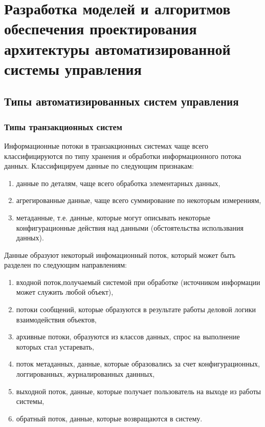 \chapter{Разработка моделей и алгоритмов обеспечения проектирования архитектуры автоматизированной системы управления}\label{ch:ch2}
\section{Типы автоматизированных систем управления}\label{sec:ch2/sec1}
\subsection{Типы транзакционных систем}\label{sec:ch2/sec1/sub1}
Информационные потоки в транзакционных системах чаще всего классифицируются по типу хранения и обработки информационного потока данных. Классифицируем данные по следующим признакам:
\begin{enumerate}
	\item данные по деталям, чаще всего обработка элементарных данных,
	\item агрегированные данные, чаще всего суммирование по некоторым измерениям,
	\item метаданные, т.е. данные, которые могут описывать некоторые конфигурационные действия над данными (обстоятельства использвания данных).
\end{enumerate}
Данные образуют некоторый инфомационный поток, который может быть разделен по следующим направлениям:
\begin{enumerate}
	\item входной поток,получаемый системой при обработке (источником информации может служить любой объект),
	\item потоки сообщений, которые образуются в результате работы деловой логики взаимодействия объектов,
	\item архивные потоки, образуются из классов данных, спрос на выполнение которых стал устаревать,
	\item поток метаданных, данные, которые образовались за счет конфигурационных, логгированных, журналированных даннных,
	\item выходной поток, данные, которые получает пользователь на выходе из работы системы,
	\item  обратный поток, данные, которые возвращаются в систему.
\end{enumerate}
